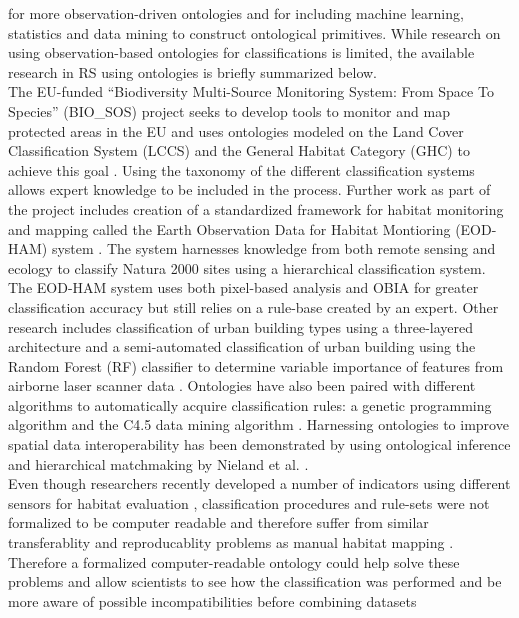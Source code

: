 \documentclass[authoryear, review,12pt,number]{elsarticle}
\begin{document}
for more observation-driven ontologies and for including machine learning,
statistics and data mining to construct ontological primitives. While
research on using observation-based ontologies for classifications is limited,
the available research in RS using ontologies is briefly summarized below.
\\
The EU-funded ``Biodiversity Multi-Source Monitoring System: From Space To
Species'' (BIO\_SOS) project seeks to develop tools to monitor and map protected
areas in the EU and uses ontologies modeled on the Land Cover Classification
System (LCCS) and the General Habitat Category (GHC) to achieve this goal
\citep{Arvor2013}. Using the taxonomy of the different classification systems
allows expert knowledge to be included in the process. Further work as part of
the project includes creation of a standardized
framework for habitat monitoring and mapping called the Earth Observation Data
for Habitat Montioring (EOD-HAM) system \citep{Lucas2015}. The system harnesses
knowledge from both remote sensing and ecology to classify Natura 2000 sites
using a hierarchical classification system. The EOD-HAM system uses both
pixel-based analysis and OBIA for greater classification accuracy but still
relies on a rule-base created by an expert. Other research includes
classification of urban building types using a three-layered architecture
\citep{diSciascio2013} and a semi-automated classification of urban building
using the Random Forest (RF) classifier to determine variable importance of
features from airborne laser scanner data \citep{Belgiu2014}. Ontologies have
also been paired with different algorithms to automatically acquire
classification rules: a genetic programming algorithm
\citep{Forestier2012470} and the C4.5 data mining algorithm
\citep{Sheeren2006ML}. Harnessing ontologies to improve spatial data
interoperability has been demonstrated by using ontological inference and
hierarchical matchmaking by Nieland et al. \citep{Nieland2015}. 
\\
Even though researchers recently developed a number of indicators using
different sensors for habitat evaluation \citep{Nagendra2013}, classification
procedures and rule-sets were not formalized to be computer readable and
therefore suffer from similar transferablity and reproducablity problems as
manual habitat mapping \citep{Arvor2013, Nieland2015}.
Therefore a formalized computer-readable ontology could help solve these
problems and allow scientists to see how the classification was performed and be
more aware of possible incompatibilities before combining datasets
\end{document}
